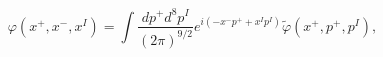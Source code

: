 \begin{equation}
\varphi(x^+, x^-, x^I) = \int \frac{dp^+ d^8 p^I}{ ( 2\pi)^{9/2}}
e^{i ( - x^- p^+ + x^I p^I)} \tilde \varphi ( x^+, p^+, p^I),
\end{equation}

